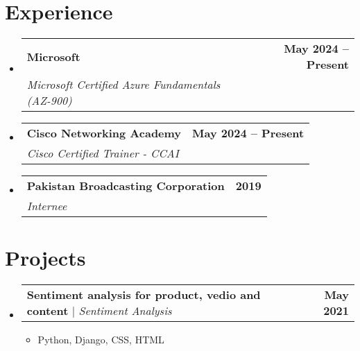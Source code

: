 \documentclass[letterpaper,11pt]{article}
\makeatletter
\newcommand{\resumeItem}[1]{
  \item\small{
    {#1 \vspace{-2pt}}
  }
}
\newcommand{\resumeSubheading}[4]{
  \vspace{-2pt}\item
    \begin{tabular*}{1.0\textwidth}[t]{l@{\extracolsep{\fill}}r}
      \textbf{#1} & \textbf{\small #2} \\
      \textit{\small#3} & \textit{\small #4} \\
    \end{tabular*}\vspace{-7pt}
}
\newcommand{\resumeProjectHeading}[2]{
    \item
    \begin{tabular*}{1.001\textwidth}{l@{\extracolsep{\fill}}r}
      \small#1 & \textbf{\small #2}\\
    \end{tabular*}\vspace{-7pt}
}
\newcommand{\resumeSubHeadingListStart}{\begin{itemize}[leftmargin=0.0in, label={}]}
\newcommand{\resumeSubHeadingListEnd}{\end{itemize}}
\newcommand{\resumeItemListStart}{\begin{itemize}}
\newcommand{\resumeItemListEnd}{\end{itemize}\vspace{-5pt}}
\makeatother
\begin{document}
\section{Experience}
  \resumeSubHeadingListStart

    \resumeSubheading
      {Microsoft}{May 2024 -- Present}
      {Microsoft Certified Azure Fundamentals (AZ-900)}{}

    \resumeSubheading
      {Cisco Networking Academy}{May 2024 -- Present}
      {Cisco Certified Trainer - CCAI}{}

      
    \resumeSubheading
      {Pakistan Broadcasting Corporation}{2019}
      {Internee}{}

    
  \resumeSubHeadingListEnd
\vspace{-16pt}

\section{Projects}
    \vspace{-5pt}
    \resumeSubHeadingListStart
      \resumeProjectHeading
          {\textbf{Sentiment analysis for product, vedio and content} $|$ \emph{Sentiment Analysis}}{May 2021}
          \resumeItemListStart
            \resumeItem{Python, Django, CSS, HTML}
          \resumeItemListEnd
          \vspace{-13pt}
          \vspace{-13pt}

    \resumeSubHeadingListEnd
\vspace{-5pt}


%

\end{document}
